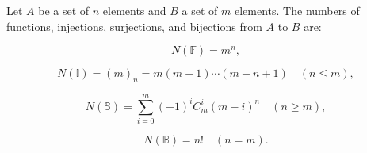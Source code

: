 Let $A$ be a set of $n$ elements and $B$ a set of $m$ elements. The numbers of functions, injections, surjections, and bijections from $A$ to $B$ are:

$$N(\mathbb{F}) = m^n,$$

$$N(\mathbb{I}) = (m)_n = m(m-1) \cdots (m-n+1) \quad (n \leq m),$$

$$N(\mathbb{S}) = \sum_{i=0}^{m} (-1)^i C_m^i (m-i)^n \quad (n \geq m),$$

$$N(\mathbb{B}) = n! \quad (n = m).$$
